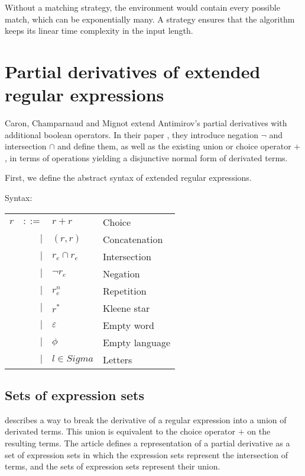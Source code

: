 Without a matching strategy, the environment would contain every possible match,
which can be exponentially many. A strategy ensures that the algorithm keeps its
linear time complexity in the input length.


\section{Partial derivatives of extended regular expressions}

Caron, Champarnaud and Mignot extend Antimirov's partial derivatives with
additional boolean operators. In their paper \cite{pdere}, they introduce
negation $\neg$ and intersection $\cap$ and define them, as well as the existing
union or choice operator $+$, in terms of operations yielding a disjunctive
normal form of derivated terms.

First, we define the abstract syntax of extended regular expressions.

\begin{defn}
   \label{defn-ere-syn}
   Syntax:

   \begin{tabular}{lrll}
      $r$	& $::=$	& $r+r$				& Choice		\\
		& $|$	& $(r,r)$			& Concatenation		\\
		& $|$	& $r_e \cap r_e$		& Intersection		\\
        	& $|$	& $\neg r_e$			& Negation		\\
        	& $|$	& $r_e^n$			& Repetition		\\
		& $|$	& $r^*$				& Kleene star		\\
		& $|$	& $\varepsilon$			& Empty word		\\
		& $|$	& $\phi$			& Empty language	\\
		& $|$	& $l \in Sigma$			& Letters		\\
   \end{tabular}
\end{defn}


\subsection{Sets of expression sets}

\cite{pdere} describes a way to break the derivative of a regular expression
into a union of derivated terms. This union is equivalent to the choice operator
$+$ on the resulting terms. The article defines a representation of a partial
derivative as a set of expression sets in which the expression sets represent
the intersection of terms, and the sets of expression sets represent their
union.


